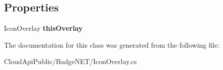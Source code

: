 \subsection*{Properties}
\begin{DoxyCompactItemize}
\item 
\hypertarget{class_cloud_api_public_1_1_badge_n_e_t_1_1_icon_overlay_1_1badge_params_1_1base_params_ab384301a8a76e8a5c03d6c204d76061a}{Icon\-Overlay {\bfseries this\-Overlay}}\label{class_cloud_api_public_1_1_badge_n_e_t_1_1_icon_overlay_1_1badge_params_1_1base_params_ab384301a8a76e8a5c03d6c204d76061a}

\end{DoxyCompactItemize}


The documentation for this class was generated from the following file\-:\begin{DoxyCompactItemize}
\item 
Cloud\-Api\-Public/\-Badge\-N\-E\-T/Icon\-Overlay.\-cs\end{DoxyCompactItemize}
